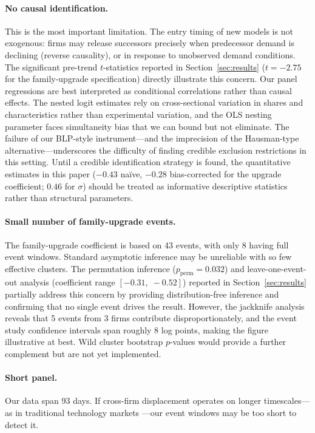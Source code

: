 \documentclass[11pt, a4paper]{article}
\begin{document}
\paragraph{No causal identification.} This is the most important limitation. The entry timing of new models is not exogenous: firms may release successors precisely when predecessor demand is declining (reverse causality), or in response to unobserved demand conditions. The significant pre-trend $t$-statistics reported in Section~\ref{sec:results} ($t = -2.75$ for the family-upgrade specification) directly illustrate this concern. Our panel regressions are best interpreted as conditional correlations rather than causal effects. The nested logit estimates rely on cross-sectional variation in shares and characteristics rather than experimental variation, and the OLS nesting parameter faces simultaneity bias that we can bound but not eliminate. The failure of our BLP-style instrument---and the imprecision of the Hausman-type alternative---underscores the difficulty of finding credible exclusion restrictions in this setting. Until a credible identification strategy is found, the quantitative estimates in this paper ($-0.43$ na\"ive, $-0.28$ bias-corrected for the upgrade coefficient; $0.46$ for $\sigma$) should be treated as informative descriptive statistics rather than structural parameters.

\paragraph{Small number of family-upgrade events.} The family-upgrade coefficient is based on 43 events, with only 8 having full event windows. Standard asymptotic inference may be unreliable with so few effective clusters. The permutation inference ($p_{\text{perm}} = 0.032$) and leave-one-event-out analysis (coefficient range $[-0.31,\; -0.52]$) reported in Section~\ref{sec:results} partially address this concern by providing distribution-free inference and confirming that no single event drives the result. However, the jackknife analysis reveals that 5 events from 3 firms contribute disproportionately, and the event study confidence intervals span roughly 8 log points, making the figure illustrative at best. Wild cluster bootstrap $p$-values would provide a further complement but are not yet implemented.

\paragraph{Short panel.} Our data span 93 days. If cross-firm displacement operates on longer timescales---as in traditional technology markets \citep{bresnahan1999technological}---our event windows may be too short to detect it.
\end{document}
